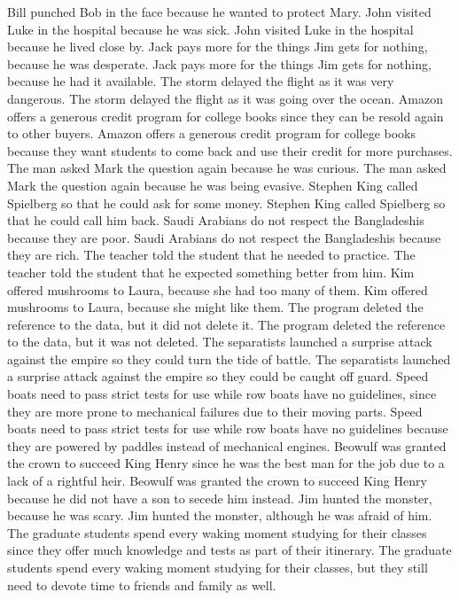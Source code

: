 \documentclass{article}
\begin{document}
\begin{enumerate}
Bill punched Bob in the face because he wanted to protect Mary.
John visited Luke in the hospital because he was sick.
John visited Luke in the hospital because he lived close by.
Jack pays more for the things Jim gets for nothing, because he was desperate.
Jack pays more for the things Jim gets for nothing, because he had it available.
The storm delayed the flight as it was very dangerous.
The storm delayed the flight as it was going over the ocean.
Amazon offers a generous credit program for college books since they can be resold again to other buyers.
Amazon offers a generous credit program for college books because they want students to come back and use their credit for more purchases.
The man asked Mark the question again because he was curious.
The man asked Mark the question again because he was being evasive.
Stephen King called Spielberg so that he could ask for some money.
Stephen King called Spielberg so that he could call him back.
Saudi Arabians do not respect the Bangladeshis because they are poor.
Saudi Arabians do not respect the Bangladeshis because they are rich.
The teacher told the student that he needed to practice.
The teacher told the student that he expected something better from him.
Kim offered mushrooms to Laura, because she had too many of them.
Kim offered mushrooms to Laura, because she might like them.
The program deleted the reference to the data, but it did not delete it.
The program deleted the reference to the data, but it was not deleted.
The separatists launched a surprise attack against the empire so they could turn the tide of battle.
The separatists launched a surprise attack against the empire so they could be caught off guard.
Speed boats need to pass strict tests for use while row boats have no guidelines, since they are more prone to mechanical failures due to their moving parts.
Speed boats need to pass strict tests for use while row boats have no guidelines because they are powered by paddles instead of mechanical engines.
Beowulf was granted the crown to succeed King Henry since he was the best man for the job due to a lack of a rightful heir.
Beowulf was granted the crown to succeed King Henry because he did not have a son to secede him instead.
Jim hunted the monster, because he was scary.
Jim hunted the monster, although he was afraid of him.
The graduate students spend every waking moment studying for their classes since they offer much knowledge and tests as part of their itinerary.
The graduate students spend every waking moment studying for their classes, but they still need to devote time to friends and family as well.

\end{enumerate}
\end{document}
